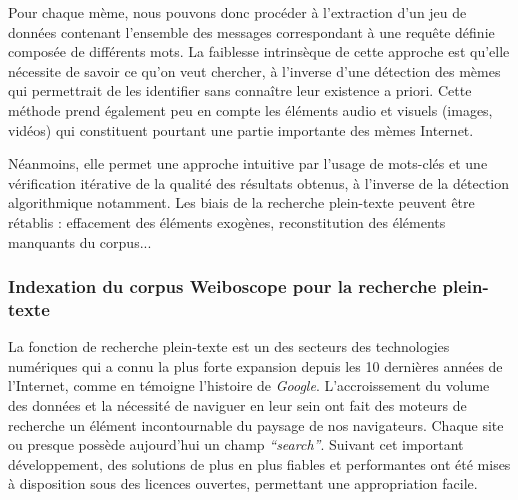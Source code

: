     Pour chaque mème, nous pouvons donc procéder à l{\textquoteright}extraction d{\textquoteright}un jeu de données contenant l{\textquoteright}ensemble des messages correspondant à une requête définie composée de différents mots. La faiblesse intrinsèque de cette approche est qu'elle nécessite de savoir ce qu'on veut chercher, à l'inverse d'une détection des mèmes qui permettrait de les identifier sans connaître leur existence a priori. Cette méthode prend également peu en compte les éléments audio et visuels (images, vidéos) qui constituent pourtant une partie importante des mèmes Internet. 

    Néanmoins, elle permet une approche intuitive par l'usage de mots-clés et une vérification itérative de la qualité des résultats obtenus, à l'inverse de la détection algorithmique notamment. Les biais de la recherche plein-texte peuvent être rétablis : effacement des éléments exogènes, reconstitution des éléments manquants du corpus... 

\subsubsection[Indexation pour la recherche plein-texte]{Indexation du corpus Weiboscope pour la recherche plein-texte}

    La fonction de recherche plein-texte est un des secteurs des technologies numériques qui a connu la plus forte expansion depuis les 10 dernières années de l'Internet, comme en témoigne l'histoire de \textit{Google}. L'accroissement du volume des données et la nécessité de naviguer en leur sein ont fait des moteurs de recherche un élément incontournable du paysage de nos navigateurs. Chaque site ou presque possède aujourd'hui un champ \textit{``search''}. Suivant cet important développement, des solutions de plus en plus fiables et performantes ont été mises à disposition sous des licences ouvertes, permettant une appropriation facile.

